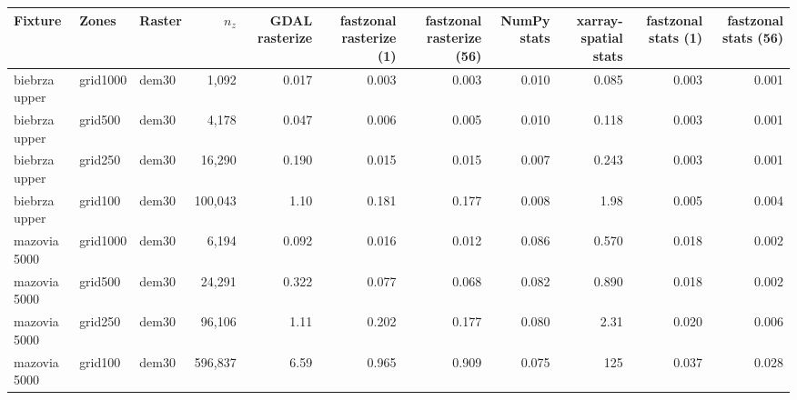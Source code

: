 \begin{tabular}{lllrrrrrrrr}
\toprule
Fixture & Zones & Raster & $n_z$ & GDAL rasterize & fastzonal rasterize (1) & fastzonal rasterize (56) & NumPy stats & xarray-spatial stats & fastzonal stats (1) & fastzonal stats (56) \\
\midrule
biebrza upper & grid1000 & dem30 & 1,092 & 0.017 & 0.003 & 0.003 & 0.010 & 0.085 & 0.003 & 0.001 \\
biebrza upper & grid500 & dem30 & 4,178 & 0.047 & 0.006 & 0.005 & 0.010 & 0.118 & 0.003 & 0.001 \\
biebrza upper & grid250 & dem30 & 16,290 & 0.190 & 0.015 & 0.015 & 0.007 & 0.243 & 0.003 & 0.001 \\
biebrza upper & grid100 & dem30 & 100,043 & 1.10 & 0.181 & 0.177 & 0.008 & 1.98 & 0.005 & 0.004 \\
mazovia 5000 & grid1000 & dem30 & 6,194 & 0.092 & 0.016 & 0.012 & 0.086 & 0.570 & 0.018 & 0.002 \\
mazovia 5000 & grid500 & dem30 & 24,291 & 0.322 & 0.077 & 0.068 & 0.082 & 0.890 & 0.018 & 0.002 \\
mazovia 5000 & grid250 & dem30 & 96,106 & 1.11 & 0.202 & 0.177 & 0.080 & 2.31 & 0.020 & 0.006 \\
mazovia 5000 & grid100 & dem30 & 596,837 & 6.59 & 0.965 & 0.909 & 0.075 & 125 & 0.037 & 0.028 \\
\bottomrule
\end{tabular}

